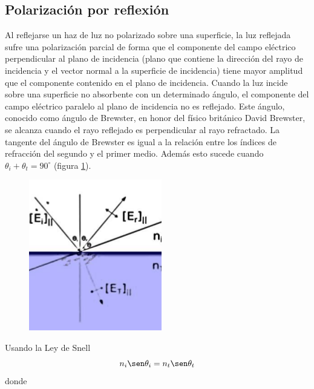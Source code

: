\documentclass[13,twocolumn,letterpaper]{article}
\begin{document}
	\subsection*{Polarización por reflexión}
	{
		Al reflejarse un haz de luz no polarizado sobre una superficie, la luz reflejada sufre
		una polarización parcial de forma que el componente del campo eléctrico
		perpendicular al plano de incidencia (plano que contiene la dirección del rayo de
		incidencia y el vector normal a la superficie de incidencia) tiene mayor amplitud
		que el componente contenido en el plano de incidencia. Cuando la luz incide sobre una
		superficie no absorbente con un
		determinado ángulo, el componente del
		campo eléctrico paralelo al plano de
		incidencia no es reflejado. Este ángulo,
		conocido como ángulo de Brewster, en
		honor del físico británico David
		Brewster, se alcanza cuando el rayo
		reflejado es perpendicular al rayo
		refractado. La tangente del ángulo de
		Brewster es igual a la relación entre los
		índices de refracción del segundo y el
		primer medio. Además esto sucede
		cuando $\theta_{i}+\theta_{t}=90^{\circ}$ (figura \ref{fig:fig1}).\\
		\begin{figure}[h!]
			\centering
			\includegraphics[width=0.7\linewidth]{fig1}
			\caption{}
			\label{fig:fig1}
		\end{figure}
		Usando la Ley de Snell
		\begin{equation}\label{ec1}
		n_{i}\sen\theta_{i}=n_{t}\sen\theta_{t}
		\end{equation}
		donde 
		\begin{equation}\label{ec2}

\end{equation}}
\end{document}
